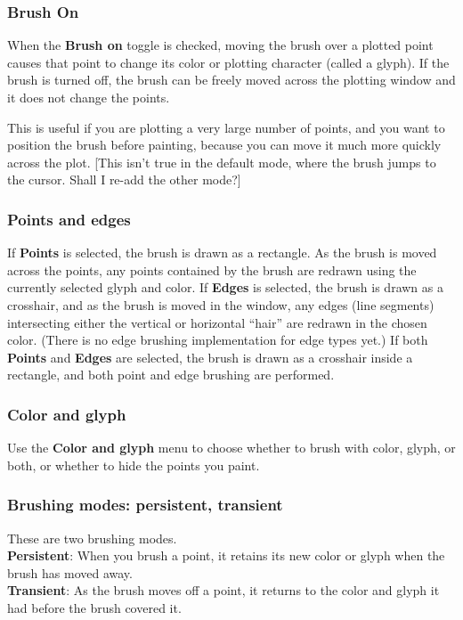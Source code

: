 \documentclass[11pt]{article}
\begin{document}
\subsubsection{Brush On}
%
When the {\bf Brush on} toggle is checked, moving the brush
over a plotted point causes that point to change its color or
plotting character (called a glyph).  If the brush is turned off, the
brush can be freely moved across the plotting window and it does not
change the points.  

This is useful if you are plotting a very large number of points,
and you want to position the brush before painting, because you
can move it much more quickly across the plot.  [This isn't true
in the default mode, where the brush jumps to the cursor.  Shall
I re-add the other mode?]

\subsubsection{Points and edges}
%
If {\bf Points} is selected, the brush is drawn as a rectangle.  As
the brush is moved across the points, any points contained by the
brush are redrawn using the currently selected glyph and color.  If
{\bf Edges} is selected, the brush is drawn as a crosshair, and as
the brush is moved in the window, any edges (line segments)
intersecting either the vertical or horizontal ``hair'' are redrawn
in the chosen color.  (There is no edge brushing implementation for
edge types yet.) If both {\bf Points} and {\bf Edges} are selected,
the brush is drawn as a crosshair inside a rectangle, and both point
and edge brushing are performed.

\subsubsection{Color and glyph}
%
Use the {\bf Color and glyph} menu to choose whether to brush
with color, glyph, or both, or whether to hide the points you
paint.

\subsubsection{Brushing modes:  persistent, transient}
%
These are two brushing modes.
\medskip
\noindent
\\{\bf Persistent}:  When you brush a point, it retains its new color or glyph
  when the brush has moved away.
\\{\bf Transient}:  As the brush moves off a point, it returns to the color and
  glyph it had before the brush covered it.
\end{document}
